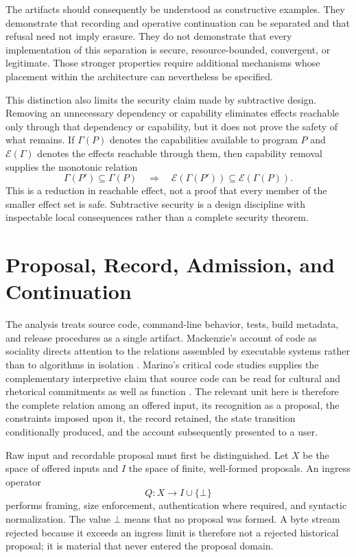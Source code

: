 \documentclass[11pt]{article}
\begin{document}
The artifacts should consequently be understood as constructive examples. They demonstrate that recording and operative continuation can be separated and that refusal need not imply erasure. They do not demonstrate that every implementation of this separation is secure, resource-bounded, convergent, or legitimate. Those stronger properties require additional mechanisms whose placement within the architecture can nevertheless be specified.

This distinction also limits the security claim made by subtractive design. Removing an unnecessary dependency or capability eliminates effects reachable only through that dependency or capability, but it does not prove the safety of what remains. If $\Gamma(P)$ denotes the capabilities available to program $P$ and $\mathcal{E}(\Gamma)$ denotes the effects reachable through them, then capability removal supplies the monotonic relation
\begin{equation}
  \Gamma(P')\subseteq\Gamma(P)
  \quad\Longrightarrow\quad
  \mathcal{E}(\Gamma(P'))\subseteq\mathcal{E}(\Gamma(P)).
  \label{eq:capability-monotonicity}
\end{equation}
This is a reduction in reachable effect, not a proof that every member of the smaller effect set is safe. Subtractive security is a design discipline with inspectable local consequences rather than a complete security theorem.

\section{Proposal, Record, Admission, and Continuation}

The analysis treats source code, command-line behavior, tests, build metadata, and release procedures as a single artifact. Mackenzie's account of code as sociality directs attention to the relations assembled by executable systems rather than to algorithms in isolation \cite{mackenzie2006}. Marino's critical code studies supplies the complementary interpretive claim that source code can be read for cultural and rhetorical commitments as well as function \cite{marino2020}. The relevant unit here is therefore the complete relation among an offered input, its recognition as a proposal, the constraints imposed upon it, the record retained, the state transition conditionally produced, and the account subsequently presented to a user.

Raw input and recordable proposal must first be distinguished. Let $X$ be the space of offered inputs and $I$ the space of finite, well-formed proposals. An ingress operator
\begin{equation}
  Q:X\to I\cup\{\bot\}
  \label{eq:ingress}
\end{equation}
performs framing, size enforcement, authentication where required, and syntactic normalization. The value $\bot$ means that no proposal was formed. A byte stream rejected because it exceeds an ingress limit is therefore not a rejected historical proposal; it is material that never entered the proposal domain.
\end{document}
